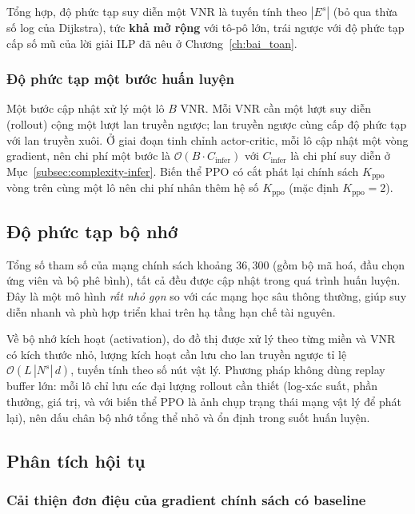 \documentclass[../DoAn.tex]{subfiles}
\begin{document}
Tổng hợp, độ phức tạp suy diễn một VNR là tuyến tính theo $|E^s|$ (bỏ qua thừa số log của Dijkstra), tức \textbf{khả mở rộng} với tô-pô lớn, trái ngược với độ phức tạp cấp số mũ của lời giải ILP đã nêu ở Chương~\ref{ch:bai_toan}.

\subsubsection{Độ phức tạp một bước huấn luyện}
\label{subsec:complexity-train}

Một bước cập nhật xử lý một lô $B$ VNR. Mỗi VNR cần một lượt suy diễn (rollout) cộng một lượt lan truyền ngược; lan truyền ngược cùng cấp độ phức tạp với lan truyền xuôi. Ở giai đoạn tinh chỉnh actor-critic, mỗi lô cập nhật một vòng gradient, nên chi phí một bước là $\mathcal{O}(B \cdot C_{\text{infer}})$ với $C_{\text{infer}}$ là chi phí suy diễn ở Mục~\ref{subsec:complexity-infer}. Biến thể PPO có cắt phát lại chính sách $K_{\text{ppo}}$ vòng trên cùng một lô nên chi phí nhân thêm hệ số $K_{\text{ppo}}$ (mặc định $K_{\text{ppo}}=2$).

\subsection{Độ phức tạp bộ nhớ}
\label{sec:complexity-mem}

Tổng số tham số của mạng chính sách khoảng $36{,}300$ (gồm bộ mã hoá, đầu chọn ứng viên và bộ phê bình), tất cả đều được cập nhật trong quá trình huấn luyện. Đây là một mô hình \textit{rất nhỏ gọn} so với các mạng học sâu thông thường, giúp suy diễn nhanh và phù hợp triển khai trên hạ tầng hạn chế tài nguyên.

Về bộ nhớ kích hoạt (activation), do đồ thị được xử lý theo từng miền và VNR có kích thước nhỏ, lượng kích hoạt cần lưu cho lan truyền ngược tỉ lệ $\mathcal{O}(L\,|N^s|\,d)$, tuyến tính theo số nút vật lý. Phương pháp không dùng replay buffer lớn: mỗi lô chỉ lưu các đại lượng rollout cần thiết (log-xác suất, phần thưởng, giá trị, và với biến thể PPO là ảnh chụp trạng thái mạng vật lý để phát lại), nên dấu chân bộ nhớ tổng thể nhỏ và ổn định trong suốt huấn luyện.

\subsection{Phân tích hội tụ}
\label{sec:convergence}

\subsubsection{Cải thiện đơn điệu của gradient chính sách có baseline}
\label{subsec:conv-monotonic}
\end{document}
